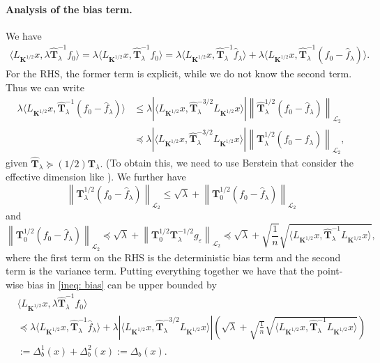 \documentclass[11pt,a4paper]{article}
\renewcommand{\hat}{\widehat}
\theoremstyle{definition}
\theoremstyle{plain}
\theoremstyle{remark}
\begin{document}
\paragraph{Analysis of the bias term.}
We have
\begin{align}
	\langle L_{\boldsymbol K^{1/2}}x, \lambda \hat{\boldsymbol{T}}_\lambda^{-1}f_0\rangle=\lambda 	\langle L_{\boldsymbol K^{1/2}}x,  \hat{\boldsymbol{T}}_\lambda^{-1}f_0\rangle = \lambda 	\langle L_{\boldsymbol K^{1/2}}x,  \hat{\boldsymbol{T}}_\lambda^{-1}\hat{f}_\lambda\rangle + \lambda 	\langle L_{\boldsymbol K^{1/2}}x,  \hat{\boldsymbol{T}}_\lambda^{-1}(f_0-\hat{f}_\lambda)\rangle .\label{ineq: bias}
\end{align}
For the RHS, the former term is explicit, while we do not know the second term. Thus we can write
\begin{align*}
	\lambda 	\langle L_{\boldsymbol K^{1/2}}x,  \hat{\boldsymbol{T}}_\lambda^{-1}(f_0-\hat{f}_\lambda)\rangle&\leq \lambda \left|{\langle L_{\boldsymbol K^{1/2}} x,\hat{\boldsymbol T}_{\lambda}^{-3/2} L_{\boldsymbol K^{1/2}} x\rangle}\right|\left\|\hat{\boldsymbol{T}}_{\lambda}^{1/2}(f_0-\hat{f}_{\lambda})\right\|_{\mathcal L_2}\\&\preceq\lambda \left|{\langle L_{\boldsymbol K^{1/2}} x,\hat{\boldsymbol T}_{\lambda}^{-3/2} L_{\boldsymbol K^{1/2}} x\rangle}\right|\left\|{\boldsymbol{T}}_{\lambda}^{1/2}(f_0-\hat{f}_{\lambda})\right\|_{\mathcal L_2},
\end{align*}
given $\hat{\boldsymbol T}_{\lambda}\succeq (1/2)\boldsymbol{T}_{\lambda}.$ (To obtain this, we need to use Berstein that consider the effective dimension like \cite{minsker2011some}). We further have
\[\left\|{\boldsymbol{T}}_{\lambda}^{1/2}(f_0-\hat{f}_{\lambda})\right\|_{\mathcal L_2}\leq \sqrt{\lambda}+\left\|{\boldsymbol{T}}_{0}^{1/2}(f_0-\hat{f}_{\lambda})\right\|_{\mathcal L_2}\]
and
\[\left\|{\boldsymbol{T}}_{0}^{1/2}(f_0-\hat{f}_{\lambda})\right\|_{\mathcal L_2}\preceq \sqrt{\lambda}+\left\|\boldsymbol T_0^{1/2}\boldsymbol{T}_{\lambda}^{-1/2}g_{\varepsilon}\right\|_{\mathcal L_2}\preceq \sqrt{\lambda}+\sqrt{\frac{1}{n}}\sqrt{{\langle L_{\boldsymbol{K}^{1/2}}x,\hat{\boldsymbol T}_\lambda^{-1} L_{\boldsymbol K^{1/2}}x\rangle}},\]
where the first term on the RHS is the deterministic bias term and the second term is the variance term. Putting everything together we have that the point-wise bias in \eqref{ineq: bias} can be upper bounded by
\begin{align*}
		&\langle L_{\boldsymbol K^{1/2}}x, \lambda \hat{\boldsymbol{T}}_\lambda^{-1}f_0\rangle\\
		&\preceq\lambda 	\langle L_{\boldsymbol K^{1/2}}x,  \hat{\boldsymbol{T}}_\lambda^{-1}\hat{f}_\lambda\rangle + \lambda \left|{\langle L_{\boldsymbol K^{1/2}} x,\hat{\boldsymbol T}_{\lambda}^{-3/2} L_{\boldsymbol K^{1/2}} x\rangle}\right|\left(\sqrt{\lambda}+\sqrt{\frac{1}{n}}\sqrt{{\langle L_{\boldsymbol{K}^{1/2}}x,\hat{\boldsymbol T}_\lambda^{-1} L_{\boldsymbol K^{1/2}}x\rangle}}\right)\\
		&:=\Delta_b^1(x)+\Delta_b^2(x)
		:=\Delta_b(x).
\end{align*}
\end{document}
